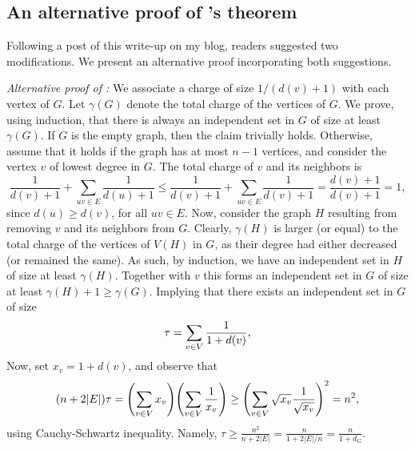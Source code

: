 \subsection{An alternative proof of \Turan's theorem}
Following a post of this write-up on my blog, readers suggested two
modifications. We present an alternative proof incorporating both
suggestions.

\medskip


\begin{proofnoproof}
    \emph{Alternative proof of :} We associate a
    charge of size $1/(d(v) +1)$ with each vertex of $G$. Let
    $\gamma(G)$ denote the total charge of the vertices of $G$.  We
    prove, using induction, that there is always an independent set in
    $G$ of size at least $\gamma(G)$. If $G$ is the empty graph, then
    the claim trivially holds. Otherwise, assume that it holds if the
    graph has at most $n-1$ vertices, and consider the vertex $v$ of
    lowest degree in $G$. The total charge of $v$ and its neighbors is
    \[
    \frac{1}{d(v) +1} +\sum_{uv \in E}\frac{1}{d(u) +1} \leq
    \frac{1}{d(v) +1} +\sum_{uv \in E}\frac{1}{d(v) +1} =
    \frac{d(v)+1}{d(v) +1} = 1,
    \]
    since $d(u) \geq d(v)$, for all $uv \in E$.  Now, consider the
    graph $H$ resulting from removing $v$ and its neighbors from
    $G$. Clearly, $\gamma(H)$ is larger (or equal) to the total charge
    of the vertices of $V(H)$ in $G$, as their degree had either
    decreased (or remained the same). As such, by induction, we have
    an independent set in $H$ of size at least $\gamma(H)$. Together
    with $v$ this forms an independent set in $G$ of size at least
    $\gamma(H) + 1 \geq \gamma(G)$. Implying that there exists an
    independent set in $G$ of size
    \begin{equation}
        \tau = \sum_{v \in V} \frac{1}{1+d(v)}, 
        \eqlab{two}
    \end{equation}
    Now, set $x_v =1 +d(v)$, and observe that 
    \begin{equation*}
        \pth{n +2 |E|} \tau = 
        \pth{\sum_{v \in V} x_v }
        \pth{\sum_{v \in V} \frac{1}{x_v} }
        \geq 
        \pth{\sum_{v \in V} \sqrt{x_v}  \frac{1}{\sqrt{x_v}}}^2
        =
        n^2,
    \end{equation*}
    using Cauchy-Schwartz inequality.  Namely,
    $\displaystyle \tau \geq \frac{n^2}{n +2 |E|} = \frac{n}{1+ 2|E|/
       n} = \frac{n}{1+ d_G}$.
\end{proofnoproof}

